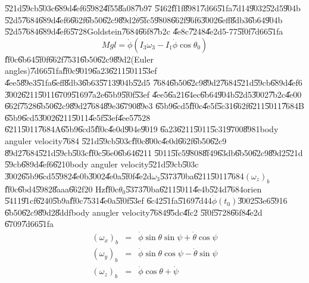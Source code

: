 \U{521d}\U{59cb}\U{503c}\U{689d}\U{4ef6}\U{5982}\U{4f55}\U{8a08}\U{7b97}%
\U{5462}\U{ff1f}\U{8981}\U{7d66}\U{51fa}\U{7d14}\U{9032}\U{52d5}\U{904b}%
\U{52d5}\U{7684}\U{689d}\U{4ef6}\U{662f}\U{6b50}\U{62c9}\U{89d2}$\dot{\theta}
$\U{5fc5}\U{9808}\U{662f}\U{96f6}\U{3002}\U{6eff}\U{8db3}\U{6b64}\U{904b}%
\U{52d5}\U{7684}\U{689d}\U{4ef6}\U{5728}Goldstein\U{7684}\U{66f8}\U{7b2c}%
\U{4e8c}\U{7248}\U{4e2d}5-77\U{5f0f}\cite{goldstein}\U{7d66}\U{51fa}%
\begin{equation*}
Mgl=\dot{\phi}\left( I_{3}\omega _{3}-I_{1}\dot{\phi}\cos \theta _{0}\right)
\end{equation*}%
\U{ff0c}\U{6b64}\U{5f0f}\U{662f}\U{7531}\U{6b50}\U{62c9}\U{89d2}(Euler
angles)\U{7d66}\U{51fa}\U{ff0c}\U{9019}\U{6a23}\U{6211}\U{5011}\U{53ef}%
\U{4ee5}\U{89e3}\U{51fa}\U{6eff}\U{8db3}\U{6b63}\U{5713}\U{904b}\U{52d5}%
\U{7684}\U{6b50}\U{62c9}\U{89d2}\U{7684}\U{521d}\U{59cb}\U{689d}\U{4ef6}%
\U{3002}\U{6211}\U{5011}\U{6709}\U{5169}\U{7a2e}\U{65b9}\U{5f0f}\U{53ef}%
\U{4ee5}\U{6a21}\U{64ec}\U{6b64}\U{904b}\U{52d5}\U{3002}\U{7b2c}\U{4e00}%
\U{662f}\U{7528}\U{6b50}\U{62c9}\U{89d2}\U{7684}\U{89e3}\U{6790}\U{89e3}%
\U{65b9}\U{6cd5}\U{ff0c}\U{4e5f}\U{5c31}\U{662f}\U{6211}\U{5011}\U{7684}B%
\U{65b9}\U{6cd5}\U{3002}\U{6211}\U{5011}\U{4e5f}\U{53ef}\U{4ee5}\U{7528}%
\U{6211}\U{5011}\U{7684}A\U{65b9}\U{6cd5}\U{ff0c}\U{4e0d}\U{904e}\U{9019}%
\U{6a23}\U{6211}\U{5011}\U{5c31}\U{9700}\U{8981}body anguler velocity\U{7684}%
\U{521d}\U{59cb}\U{503c}\U{ff0c}\U{800c}\U{4e0d}\U{662f}\U{6b50}\U{62c9}%
\U{89d2}\U{7684}\U{521d}\U{59cb}\U{503c}\U{ff0c}\U{56e0}\U{6b64}\U{6211}%
\U{5011}\U{5fc5}\U{9808}\U{8f49}\U{63db}\U{6b50}\U{62c9}\U{89d2}\U{521d}%
\U{59cb}\U{689d}\U{4ef6}\U{6210}body anguler velocity\U{521d}\U{59cb}\U{503c}%
\U{3002}\U{65b9}\U{6cd5}\U{5982}\U{4e0b}\U{3002}\U{4e0a}\U{5f0f}\U{4e2d}$%
\omega _{3}$\U{5373}\U{70ba}\U{6211}\U{5011}\U{7684}$\left( \omega
_{z}\right) _{b}$\U{ff0c}\U{6bd4}\U{5982}\U{8aaa}\U{662f}$20$ Hz\U{ff0c}$%
\theta _{0}$\U{5373}\U{70ba}\U{6211}\U{5011}\U{4e4b}\U{524d}\U{7684}orien%
\U{5411}\U{91cf}\U{6240}\U{5b9a}\U{ff0c}\U{7531}\U{4e0a}\U{5f0f}\U{53ef}%
\U{6c42}\U{51fa}\U{5169}\U{7d44}$\dot{\phi}(t_{0})$\U{3002}\U{53e6}\U{5916}%
\U{6b50}\U{62c9}\U{89d2}\U{8ddf}body anugler velocity\U{7684}\U{95dc}\U{4fc2}%
\U{5f0f}\U{5728}\U{66f8}\U{4e2d}\cite[Chapter 4, Equation 125]{goldstein}%
\U{6709}\U{7d66}\U{51fa}%
\begin{eqnarray*}
(\omega _{x})_{b} &=&\dot{\phi}\sin \theta \sin \psi +\dot{\theta}\cos \psi
\\
(\omega _{y})_{b} &=&\dot{\phi}\sin \theta \cos \psi -\dot{\theta}\sin \psi
\\
(\omega _{z})_{b} &=&\dot{\phi}\cos \theta +\dot{\psi}
\end{eqnarray*}%
